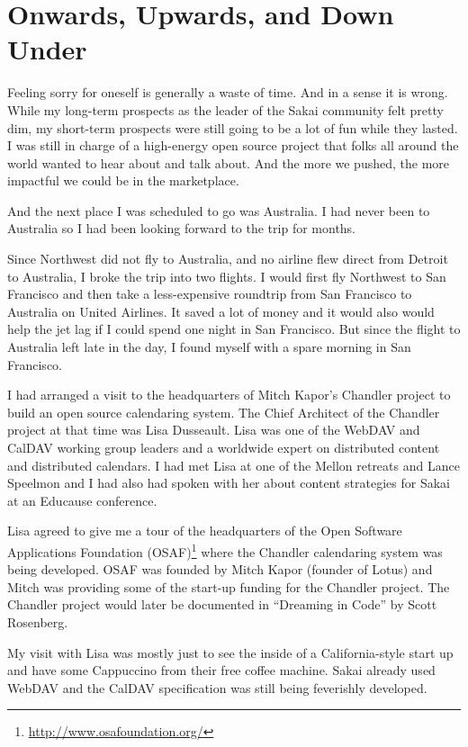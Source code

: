 \documentclass[12pt]{book}
\begin{document}
\chapter{Onwards, Upwards, and Down Under}

Feeling sorry for oneself is generally a waste of time.
And in a sense it is wrong.  While my long-term prospects
as the leader of the Sakai community felt pretty dim,
my short-term prospects were still going to be a lot of
fun while they lasted.
I was still in charge of a high-energy open source project
that folks all around the world wanted to hear about
and talk about.  And the more we pushed, the more impactful
we could be in the marketplace.

And the next place I was scheduled to go was Australia.
I had never been to Australia so I had been
looking forward to the trip for months.

Since Northwest did not fly to Australia, and no airline
flew direct from Detroit to Australia, I broke the trip
into two flights.  I would first fly Northwest to San
Francisco and then take a less-expensive roundtrip from
San Francisco to Australia on United Airlines.  It saved a lot
of money and it would also would help
the jet lag if I could spend one night in
San Francisco.  But since the flight to Australia
left late in the day, I found myself with a spare
morning in San Francisco.

I had arranged a visit to the headquarters of
Mitch Kapor's Chandler
project to build an open source calendaring system.
The Chief Architect of the Chandler project at that
time was Lisa Dusseault.  Lisa was one of the
WebDAV and CalDAV working group leaders and a
worldwide expert on distributed content and
distributed calendars.  I had met Lisa at one of
the Mellon retreats and Lance Speelmon and I had
also had spoken with her about content strategies
for Sakai at an Educause conference.

Lisa agreed to give me a tour of the headquarters of
the Open Software Applications Foundation
(OSAF)\footnote{\url{http://www.osafoundation.org/}}
where the
Chandler calendaring system was being developed.
OSAF was founded by Mitch Kapor (founder of Lotus)
and Mitch was providing some of the start-up
funding for the Chandler project.  The Chandler
project would later be documented in
``Dreaming in Code'' by Scott Rosenberg.

My visit with Lisa was mostly just to see the
inside of a California-style start up and have
some Cappuccino from their free coffee machine.
Sakai already used WebDAV and the CalDAV
specification was still being feverishly developed.
\end{document}
